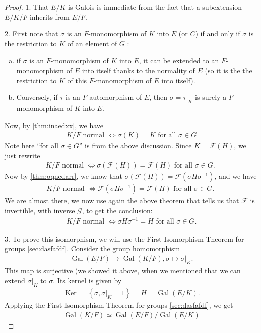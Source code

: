 \documentclass{article}
\begin{document}
\begin{proof}
1. That $E / K$ is Galois is immediate from the fact that a subextension $E / K / F$ inherits  from $E / F$.

2. First note that $\sigma$ is an $F$-monomorphism of $K$ into $E$ (or $C$) if and only if $\sigma$ is the restriction to $K$ of an element of $G$ : 
\begin{enumerate}[a).]
    \item if $\sigma$ is an $F$-monomorphism of $K$ into $E$, it can be extended to an $F$-monomorphism of $E$ into itself thanks to the normality of $E$ (so it is the the restriction to $K$ of this $F$-monomorphism of $E$ into itself).
    \item  Conversely, if $\tau$ is an $F$-automorphism of $E$, then $\sigma=\left.\tau\right|_{K}$ is surely a $F$-monomorphism of $K$ into $E$.
\end{enumerate}
Now, by \cref{thm:inaedxx}, we have
\begin{align*}
K / F \text { normal } \Longleftrightarrow \sigma(K)=K \text { for all } \sigma \in G
\end{align*}
Note here ``for all $\sigma \in G$'' is from the above discussion.
Since $K=\mathcal{F}(H)$, we just rewrite
\begin{align*}
K / F \text { normal } \Longleftrightarrow \sigma(\mathcal{F}(H))=\mathcal{F}(H) \text { for all } \sigma \in G \text {. }
\end{align*}
Now by \cref{thm:oqnedarr}, we know that $\sigma(\mathcal{F}(H))=\mathcal{F}\left(\sigma H \sigma^{-1}\right)$, and we have
\begin{align*}
K / F \text { normal } \Longleftrightarrow \mathcal{F}\left(\sigma H \sigma^{-1}\right)=\mathcal{F}(H) \text { for all } \sigma \in G \text {. }
\end{align*}
We are almost there, we now use again the above theorem that tells us that $\mathcal{F}$ is invertible, with inverse $\mathcal{G}$, to get the conclusion:
\begin{align*}
K / F \text { normal } \Longleftrightarrow \sigma H \sigma^{-1}=H \text { for all } \sigma \in G .
\end{align*}

3. To prove this isomorphism, we will use the First Isomorphism Theorem for groups \cref{sec:dasfafdf}. Consider the group homomorphism
\begin{align*}
\operatorname{Gal}(E / F) \rightarrow \operatorname{Gal}(K / F),\left.\sigma \mapsto \sigma\right|_{K} .
\end{align*}
This map is surjective (we showed it above, when we mentioned that we can extend $\left.\sigma\right|_{K}$ to $\sigma$. Its kernel is given by
\begin{align*}
\operatorname{Ker}=\left\{\sigma,\left.\sigma\right|_{K}=1\right\}=H=\operatorname{Gal}(E / K) .
\end{align*}
Applying the First Isomorphism Theorem for groups \cref{sec:dasfafdf}, we get
\begin{align*}
\operatorname{Gal}(K / F) \simeq \operatorname{Gal}(E / F) / \operatorname{Gal}(E / K)
\end{align*}


\end{proof}
\end{document}
